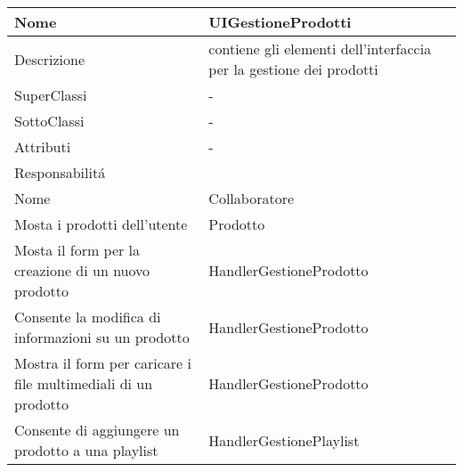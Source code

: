 \begin{center} %
    \begin{longtable}{ |p{3cm}|p{3cm}|p{3cm}|p{3cm}| }
        \hline
        Nome & \multicolumn{3}{|p{9cm}|}{UIGestioneProdotti} \\\hline
        Descrizione & \multicolumn{3}{|p{9cm}|}{contiene gli elementi dell'interfaccia per la gestione dei prodotti} \\\hline
        SuperClassi & \multicolumn{3}{|p{9cm}|}{-} \\\hline
        SottoClassi & \multicolumn{3}{|p{9cm}|}{-} \\\hline
        Attributi & \multicolumn{3}{|p{9cm}|}{-} \\\hline
        \multicolumn{4}{|p{12cm}|}{Responsabilit\'a} \\\hline %
        \multicolumn{2}{|p{6cm}|}{Nome} & \multicolumn{2}{|p{6cm}|}{Collaboratore} \\\hline
        \multicolumn{2}{|p{6cm}|}{Mosta i prodotti dell'utente} & \multicolumn{2}{|p{6cm}|}{Prodotto} \\\hline
        \multicolumn{2}{|p{6cm}|}{Mosta il form per la creazione di un nuovo prodotto} & \multicolumn{2}{|p{6cm}|}{HandlerGestioneProdotto} \\\hline
        \multicolumn{2}{|p{6cm}|}{Consente la modifica di informazioni su un prodotto} & \multicolumn{2}{|p{6cm}|}{HandlerGestioneProdotto} \\\hline
        \multicolumn{2}{|p{6cm}|}{Mostra il form per caricare i file multimediali di un prodotto} & \multicolumn{2}{|p{6cm}|}{HandlerGestioneProdotto} \\\hline
        \multicolumn{2}{|p{6cm}|}{Consente di aggiungere un prodotto a una playlist} & \multicolumn{2}{|p{6cm}|}{HandlerGestionePlaylist} \\\hline
    \end{longtable}
\end{center}



